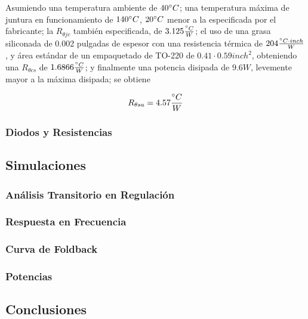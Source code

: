 Asumiendo una temperatura ambiente de $40\degree C$; una temperatura máxima de juntura en funcionamiento de $140\degree C$, $20\degree C$ menor a la especificada por el fabricante; la $R_{\theta jc}$ también especificada, de $3.125\frac{\degree C}{W}$; el uso de una grasa siliconada de 0.002 pulgadas de espesor con una resistencia térmica de $204\frac{\degree C \cdot inch}{W}$, y área estándar de un empaquetado de TO-220 de $0.41\cdot 0.59 inch^2$, obteniendo una $R_{\theta cs}$ de $1.6866 \frac{\degree C}{W}$; y finalmente una potencia disipada de $9.6W$, levemente mayor a la máxima disipada; se obtiene

\begin{equation}
R_{\theta sa} = 4.57 \frac{\degree C}{W}
\end{equation}

\subsubsection{Diodos y Resistencias}

\subsection{Simulaciones}
\subsubsection{Análisis Transitorio en Regulación}
\subsubsection{Respuesta en Frecuencia}
\subsubsection{Curva de Foldback}
\subsubsection{Potencias}

\subsection{Conclusiones}











